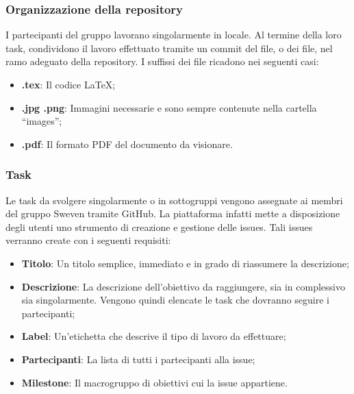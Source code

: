 \subsubsection{Organizzazione della repository}
I partecipanti del gruppo lavorano singolarmente in locale. Al termine della loro task, condividono 
il lavoro effettuato tramite un commit del file, o dei file, nel ramo adeguato della repository.
I suffissi dei file ricadono nei seguenti casi:
\begin{itemize}
    \item \textbf{.tex}: Il codice \LaTeX;
    \item \textbf{.jpg .png}: Immagini necessarie e sono sempre contenute nella cartella ``images'';
    \item \textbf{.pdf}: Il formato PDF del documento da visionare.
\end{itemize}
\subsubsection{Task}
Le task da svolgere singolarmente o in sottogruppi vengono assegnate ai membri del gruppo Sweven tramite
GitHub. La piattaforma infatti mette a disposizione degli utenti uno strumento di creazione e gestione delle 
issues. Tali issues verranno create con i seguenti requisiti:
\begin{itemize}
    \item \textbf{Titolo}: Un titolo semplice, immediato e in grado di riassumere la descrizione;
    \item \textbf{Descrizione}: La descrizione dell'obiettivo da raggiungere, sia in complessivo sia singolarmente. 
                                Vengono quindi elencate le task che dovranno seguire i partecipanti;
    \item \textbf{Label}: Un'etichetta che descrive il tipo di lavoro da effettuare;
    \item \textbf{Partecipanti}: La lista di tutti i partecipanti alla issue;
    \item \textbf{Milestone}: Il macrogruppo di obiettivi cui la issue appartiene.
\end{itemize}